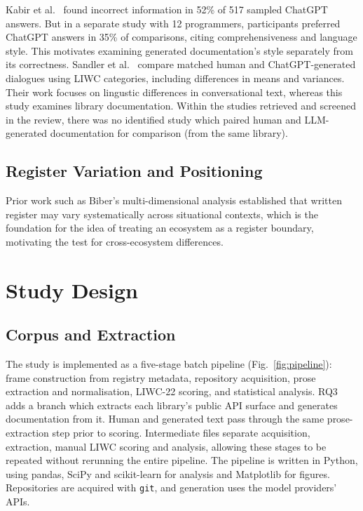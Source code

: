 \documentclass[conference]{IEEEtran}
\begin{document}
Kabir et al.~\cite{kabir2024} found incorrect information in 52\% of 517 sampled ChatGPT answers. But in a separate study with 12 programmers, participants preferred ChatGPT answers in 35\% of comparisons, citing
comprehensiveness and language style. This motivates examining generated documentation's style separately from its correctness. Sandler et al.~\cite{sandler2024} compare matched human and ChatGPT-generated
dialogues using LIWC categories, including differences in means and variances. Their work focuses on lingustic differences in conversational text, whereas this study examines library documentation. Within the studies retrieved and screened in the review, there was no identified study which paired human and LLM-generated documentation for comparison (from the same library).

\subsection{Register Variation and Positioning}

Prior work such as Biber's multi-dimensional analysis \cite{biber1988} established that written register may vary systematically across situational contexts, which is the foundation for the idea of treating an ecosystem as a register boundary, motivating the test for cross-ecosystem differences.

\section{Study Design}
\label{sec:design}

\subsection{Corpus and Extraction}

The study is implemented as a five-stage batch pipeline (Fig.~\ref{fig:pipeline}): frame construction from registry metadata, repository acquisition, prose extraction and normalisation, LIWC-22 scoring, and statistical analysis. RQ3 adds a branch which extracts each library's public API surface and generates documentation from it. Human and generated text pass through the same prose-extraction step prior to scoring. Intermediate files separate acquisition, extraction, manual LIWC scoring and analysis, allowing these stages to be repeated without rerunning the entire pipeline. The pipeline is written in Python, using pandas, SciPy and scikit-learn for analysis and Matplotlib for figures. Repositories are acquired with \texttt{git}, and generation uses the model providers' APIs.
\end{document}
